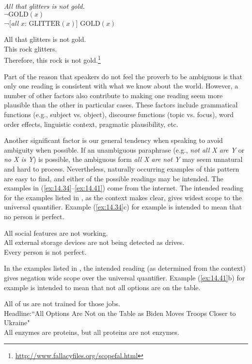 \ea \label{ex:14.32}
\textit{All that glitters is not gold.}\\
 $\neg\text{GOLD}(x)$\\
\ex  ¬[\textit{all} $x$: $\text{GLITTER}(x)$] $\text{GOLD}(x)$
                       \z
\z

\ea \label{ex:14.33}
All that glitters is not gold.\\
This rock glitters.\\
Therefore, this rock is not gold.\footnote{\url{http://www.fallacyfiles.org/scopefal.html}}
\z


Part of the reason that speakers do not feel the proverb to be ambiguous is that only one reading is consistent with what we know about the world. However, a number of other factors also contribute to making one reading seem more plausible than the other in particular cases. These factors include grammatical functions (e.g., subject vs. object), discourse functions (topic vs. focus), word order effects, linguistic context, pragmatic plausibility, etc.

Another significant factor is our general tendency when speaking to avoid ambiguity when possible. If an unambiguous paraphrase (e.g., \textit{not all X are Y} or \textit{no  X is Y}) is possible, the ambiguous form \textit{all X are not Y} may seem unnatural and hard to process. Nevertheless, naturally occurring examples of this pattern are easy to find, and either of the possible readings may be intended. The examples in (\ref{ex:14.34}--\ref{ex:14.41}) come from the internet. The intended reading for the examples listed in , as the context makes clear, gives widest scope to the universal quantifier. Example (\ref{ex:14.34}c) for example is intended to mean that no person is perfect.


\ea \label{ex:14.34}
\ea All social features are not working.\\
\ex All external storage devices are not being detected as drives.\\
\ex Every person is not perfect.
   \z
\z


In the examples listed in , the intended reading (as determined from the context) gives negation wide scope over the universal quantifier. Example (\ref{ex:14.41}b) for example is intended to mean that not all options are on the table.


\ea \label{ex:14.41}
\ea All of us are not trained for those jobs.\\
\ex Headline:``All Options Are Not on the Table as Biden Moves Troops Closer to Ukraine"\\
\ex All enzymes are proteins, but all proteins are not enzymes.
                       \z
\z



